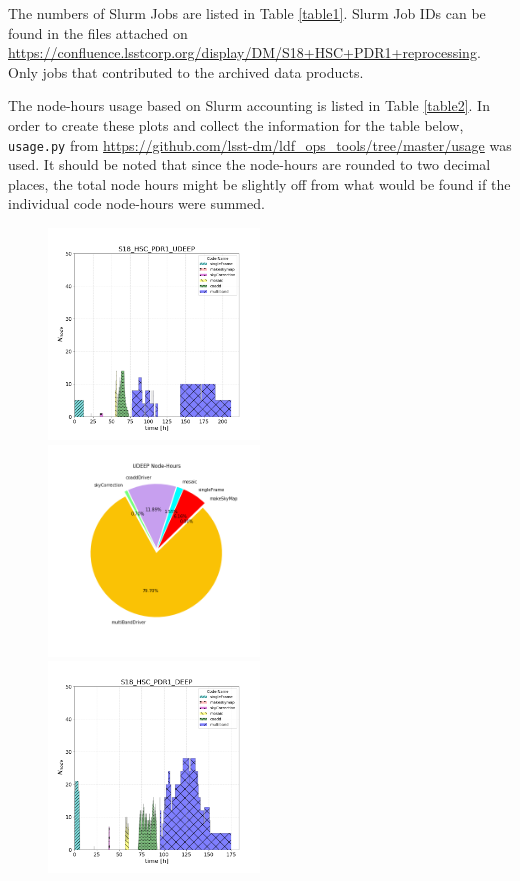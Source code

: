 The numbers of Slurm Jobs are listed in Table \ref{table1}.
Slurm Job IDs can be found in the files attached on \url{https://confluence.lsstcorp.org/display/DM/S18+HSC+PDR1+reprocessing}.
Only jobs that contributed to the archived data products.


The node-hours usage based on Slurm accounting is listed in Table \ref{table2}. 
In order to create these plots and collect the information for the table below, \texttt{usage.py} from \url{https://github.com/lsst-dm/ldf_ops_tools/tree/master/usage} was used.  It should be noted that since the node-hours are rounded to two decimal places, the total node hours might be slightly off from what would be found if the individual code node-hours were summed.


\begin{figure}[h]
\includegraphics[width=0.50\textwidth]{usage-S18_HSC_PDR1_UDEEP.png}
\includegraphics[width=0.50\textwidth]{PDR1_UDEEP_pie.png}
\includegraphics[width=0.50\textwidth]{usage-S18_HSC_PDR1_DEEP.png}

\end{figure}
